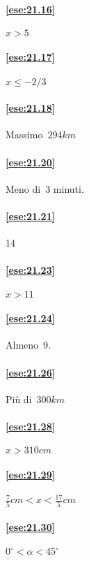 \begin{multicols}{2}
\paragraph{\ref{ese:21.16}} \(x>5\)

\paragraph{\ref{ese:21.17}} \(x\le -2/3\)

\paragraph{\ref{ese:21.18}} Massimo~\(294\unit{km}\)

\paragraph{\ref{ese:21.20}} Meno di~3 minuti.

\paragraph{\ref{ese:21.21}} 14

\paragraph{\ref{ese:21.23}} \(x>11\)

\paragraph{\ref{ese:21.24}} Almeno~9.

\paragraph{\ref{ese:21.26}} Più di~\(300\unit{km}\)

\paragraph{\ref{ese:21.28}} \(x>310\unit{cm}\)

\paragraph{\ref{ese:21.29}} \(\frac{7}{5}\unit{cm}<x<\frac{17}{5}\unit{cm}\)

\paragraph{\ref{ese:21.30}} \(0^{\circ}<\alpha<45^{\circ}\)


\end{multicols}
